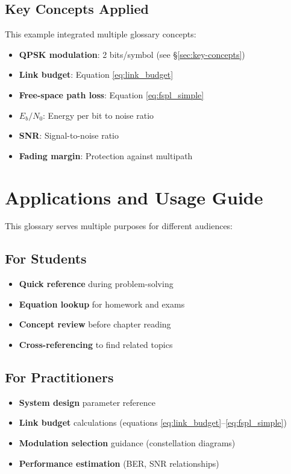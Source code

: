 \subsection*{Key Concepts Applied}
This example integrated multiple glossary concepts:
\begin{itemize}
\item \textbf{QPSK modulation}: 2 bits/symbol (see \S\ref{sec:key-concepts})
\item \textbf{Link budget}: Equation \eqref{eq:link_budget}
\item \textbf{Free-space path loss}: Equation \eqref{eq:fspl_simple}
\item \textbf{$E_b/N_0$}: Energy per bit to noise ratio
\item \textbf{SNR}: Signal-to-noise ratio
\item \textbf{Fading margin}: Protection against multipath
\end{itemize}

\section{Applications and Usage Guide}

This glossary serves multiple purposes for different audiences:

\subsection{For Students}
\begin{itemize}
\item \textbf{Quick reference} during problem-solving
\item \textbf{Equation lookup} for homework and exams
\item \textbf{Concept review} before chapter reading
\item \textbf{Cross-referencing} to find related topics
\end{itemize}

\subsection{For Practitioners}
\begin{itemize}
\item \textbf{System design} parameter reference
\item \textbf{Link budget} calculations (equations \eqref{eq:link_budget}--\eqref{eq:fspl_simple})
\item \textbf{Modulation selection} guidance (constellation diagrams)
\item \textbf{Performance estimation} (BER, SNR relationships)
\end{itemize}

